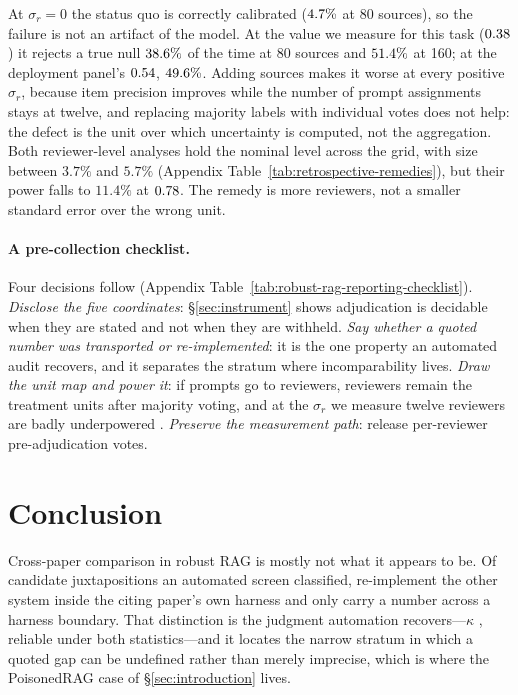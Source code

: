 \documentclass[11pt]{article}
\begin{document}
At $\sigma_r=0$ the status quo is correctly calibrated ($4.7\%$ at 80
sources), so the failure is not an artifact of the model. At the value we
measure for this task ($0.38$) it rejects a true null $38.6\%$
of the time at 80 sources and $51.4\%$ at 160; at the deployment
panel's $0.54$, $49.6\%$. Adding sources makes it worse at every
positive $\sigma_r$, because item precision improves while the number of prompt
assignments stays at twelve, and replacing majority labels with individual votes
does not help: the defect is the unit over which uncertainty is computed, not
the aggregation. Both reviewer-level analyses hold the nominal level across the
grid, with size between $3.7\%$ and $5.7\%$ (Appendix
Table~\ref{tab:retrospective-remedies}), but their power falls to $11.4\%$ at
$0.78$. The remedy is more reviewers, not a smaller standard error over
the wrong unit.

\paragraph{A pre-collection checklist.}
Four decisions follow (Appendix
Table~\ref{tab:robust-rag-reporting-checklist}). \emph{Disclose the five
coordinates}: \S\ref{sec:instrument} shows adjudication is decidable when they
are stated and not when they are withheld. \emph{Say whether a quoted number was
transported or re-implemented}: it is the one property an automated audit
recovers, and it separates the stratum where incomparability lives. \emph{Draw
the unit map and power it}: if prompts go to reviewers, reviewers remain the
treatment units after majority voting, and at the $\sigma_r$ we measure twelve
reviewers are badly underpowered \citep{card2020power}. \emph{Preserve the
measurement path}: release per-reviewer pre-adjudication votes.

\section{Conclusion}

Cross-paper comparison in robust RAG is mostly not what it appears to be. Of
\ProvClassified{} candidate juxtapositions an automated screen classified,
\ProvReimplemented{} re-implement the other system inside the citing paper's own
harness and only \ProvTransported{} carry a number across a harness boundary.
That distinction is the judgment automation recovers---$\kappa$ \DecProvK{},
reliable under both statistics---and it locates the narrow stratum in which a
quoted gap can be undefined rather than merely imprecise, which is where the
PoisonedRAG case of \S\ref{sec:introduction} lives.
\end{document}
